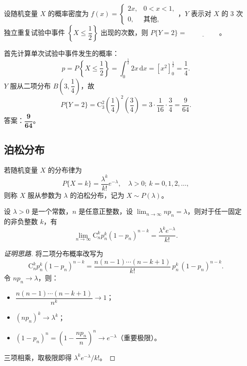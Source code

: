 ﻿\documentclass[lang=cn,11pt]{elegantbook}
\begin{document}
\begin{exercise}[概率密度与二项分布结合] \label{exer:2-41}
设随机变量 $X$ 的概率密度为 $f(x)=\begin{cases}2x, & 0<x<1, \\ 0, & \text{其他},\end{cases}$，$Y$ 表示对 $X$ 的 3 次独立重复试验中事件 $\left\{X\leqslant\dfrac{1}{2}\right\}$ 出现的次数，则 $P\{Y=2\}=\underline{\hspace{2cm}}$。
\end{exercise}
\begin{solution}
首先计算单次试验中事件发生的概率：
\[
p = P\left\{X\leqslant\frac{1}{2}\right\} = \int_0^{\frac{1}{2}}2x\,\mathrm{d}x = \left[x^2\right]_0^{\frac{1}{2}} = \frac{1}{4}.
\]
$Y$ 服从二项分布 $B\left(3,\dfrac{1}{4}\right)$，故
\[
P\{Y=2\} = \mathrm{C}_3^2\left(\frac{1}{4}\right)^2\left(\frac{3}{4}\right) = 3\cdot\frac{1}{16}\cdot\frac{3}{4} = \frac{9}{64}.
\]
答案：$\boldsymbol{\dfrac{9}{64}}$。
\end{solution}



\subsection{泊松分布} \label{subsec:poisson-dist}
\begin{definition}[泊松分布] \label{def:poisson-dist}
若随机变量 $X$ 的分布律为
\[
P\{X = k\} = \frac{\lambda^k}{k!} e^{-\lambda},\quad \lambda > 0;\ k=0,1,2,\dots,
\]
则称 $X$ 服从参数为 $\lambda$ 的泊松分布，记为 $X \sim P(\lambda)$。
\end{definition}

\begin{theorem}[泊松定理] \label{thm:poisson-approx}
设 $\lambda > 0$ 是一个常数，$n$ 是任意正整数，设 $\lim_{n \to \infty} np_n = \lambda$，则对于任一固定的非负整数 $k$，有
\[
\lim_{n \to \infty} \mathrm{C}_n^k p_n^k (1-p_n)^{n-k} = \frac{\lambda^k e^{-\lambda}}{k!}.
\]
\end{theorem}
\begin{proof}[证明思路]
将二项分布概率改写为
\[
\mathrm{C}_n^k p_n^k(1-p_n)^{n-k} = \frac{n(n-1)\cdots(n-k+1)}{k!}\,p_n^k\,(1-p_n)^{n-k}.
\]
令 \(np_n \to \lambda\)，则：
\begin{itemize}
    \item \(\dfrac{n(n-1)\cdots(n-k+1)}{n^k} \to 1\)；
    \item \(\left(np_n\right)^k \to \lambda^k\)；
    \item \((1-p_n)^n = \left(1-\dfrac{np_n}{n}\right)^n \to e^{-\lambda}\)（重要极限）。
\end{itemize}
三项相乘，取极限即得 \(\lambda^k e^{-\lambda}/k!\)。
\end{proof}
\end{document}
